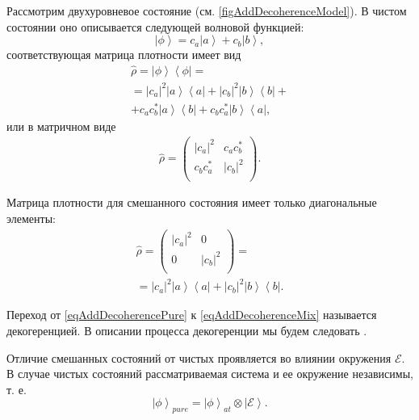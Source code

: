 Рассмотрим двухуровневое состояние
(см. \autoref{figAddDecoherenceModel}). В чистом состоянии оно
описывается 
следующей волновой функцией:
\begin{equation}
\left|\phi\right> = c_a \left|a \right> + c_b \left|b\right>,
\nonumber
\end{equation}
соответствующая матрица плотности имеет вид
\begin{eqnarray}
\hat{\rho} = \left|\phi\right>\left<\phi\right| =
\nonumber \\
= 
\left|c_a\right|^2 \left|a\right>\left<a\right| + 
\left|c_b\right|^2 \left|b\right>\left<b\right| +
\nonumber \\
+
c_a c_b^{\ast}\left|a\right>\left<b\right| +
c_b c_a^{\ast}\left|b\right>\left<a\right|,
\label{eqAddDecoherencePure}
\end{eqnarray}
или в матричном виде
\begin{eqnarray}
\hat{\rho} = 
\begin{pmatrix}
\left|c_a\right|^2 & c_a c_b^{\ast} \\
c_b c_a^{\ast} & \left|c_b\right|^2 \\
\end{pmatrix}.
\nonumber
\end{eqnarray}

Матрица плотности 
для смешанного состояния имеет только диагональные
элементы:
\begin{eqnarray}
\hat{\rho} = 
\begin{pmatrix}
\left|c_a\right|^2 & 0 \\
0 & \left|c_b\right|^2 \\
\end{pmatrix} = 
\nonumber \\
=
\left|c_a\right|^2 \left|a\right>\left<a\right| + 
\left|c_b\right|^2 \left|b\right>\left<b\right|.
\label{eqAddDecoherenceMix}
\end{eqnarray}



Переход от \eqref{eqAddDecoherencePure} к \eqref{eqAddDecoherenceMix}
называется декогеренцией. В описании процесса декогеренции мы будем следовать
 \cite{bMensky2001}. 

Отличие смешанных состояний от чистых проявляется во влиянии окружения
$\mathcal{E}$. В случае чистых состояний рассматриваемая система и ее
окружение независимы, т. е.
\begin{equation}
\left|\phi\right>_{pure} = \left|\phi\right>_{at} \otimes
\left|\mathcal{E}\right>.
\label{eqAddDecoherencePhiPure}
\end{equation}

